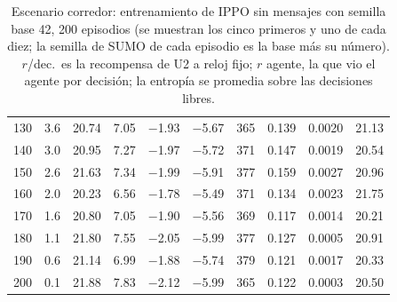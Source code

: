 \begin{table}[H]
\begin{tabular}{rrrrrrrrrr}
130 & 3.6 & 20.74 & 7.05 & $-$1.93 & $-$5.67 & 365 & 0.139 & 0.0020 & 21.13 \\
140 & 3.0 & 20.95 & 7.27 & $-$1.97 & $-$5.72 & 371 & 0.147 & 0.0019 & 20.54 \\
150 & 2.6 & 21.63 & 7.34 & $-$1.99 & $-$5.91 & 377 & 0.159 & 0.0027 & 20.96 \\
160 & 2.0 & 20.23 & 6.56 & $-$1.78 & $-$5.49 & 371 & 0.134 & 0.0023 & 21.75 \\
170 & 1.6 & 20.80 & 7.05 & $-$1.90 & $-$5.56 & 369 & 0.117 & 0.0014 & 20.21 \\
180 & 1.1 & 21.80 & 7.55 & $-$2.05 & $-$5.99 & 377 & 0.127 & 0.0005 & 20.91 \\
190 & 0.6 & 21.14 & 6.99 & $-$1.88 & $-$5.74 & 379 & 0.121 & 0.0017 & 20.33 \\
200 & 0.1 & 21.88 & 7.83 & $-$2.12 & $-$5.99 & 365 & 0.122 & 0.0003 & 20.50 \\
\bottomrule
\end{tabular}
\caption[Escenario corredor: entrenamiento de IPPO sin mensajes, semilla base 42]{Escenario corredor: entrenamiento de IPPO sin mensajes con semilla base 42, 200 episodios (se muestran los cinco primeros y uno de cada diez; la semilla de SUMO de cada episodio es la base más su número). $r$/dec.\ es la recompensa de U2 a reloj fijo; $r$ agente, la que vio el agente por decisión; la entropía se promedia sobre las decisiones libres.}
\label{tab:corredor-ippo-local-42}
\end{table}

